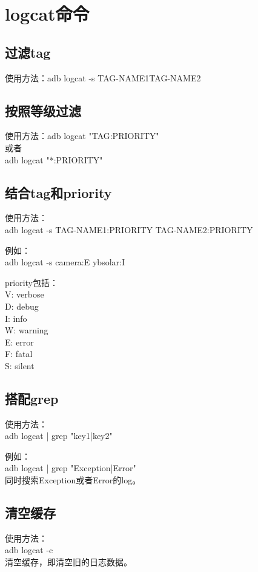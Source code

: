 
\section[logcat - Log dumper for Android] {logcat命令}
\subsection[filter tag name]{过滤tag}
使用方法：adb logcat -s \lt TAG-NAME1\gt \lt TAG-NAME2\gt

\subsection[filter by priority]{按照等级过滤}
使用方法：adb logcat "TAG:PRIORITY"\\
或者\\
adb logcat "*:PRIORITY"

\subsection[filter by tag and priority]{结合tag和priority}
使用方法：\\
adb logcat -s TAG-NAME1:PRIORITY TAG-NAME2:PRIORITY

例如：\\
adb logcat -s camera:E ybsolar:I

priority包括：\\
V: verbose\\
D: debug\\
I: info\\
W: warning\\
E: error\\
F: fatal\\
S: silent

\subsection[use grep]{搭配grep}
使用方法：\\
adb logcat | grep "key1\bs|key2"

例如：\\
adb logcat | grep "Exception\bs|Error"\\
同时搜索Exception或者Error的log。

\subsection[clear buffer]{清空缓存}
使用方法：\\
adb logcat -c\\
清空缓存，即清空旧的日志数据。

